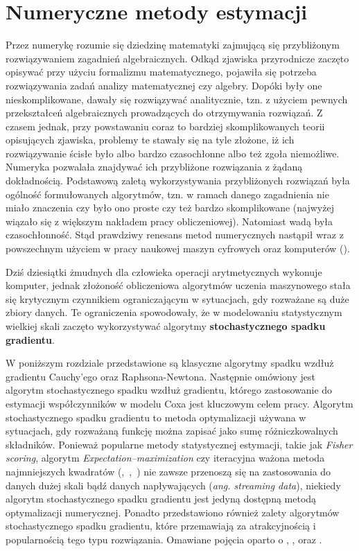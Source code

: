 \chapter{Numeryczne metody estymacji}\label{numPAJ}

Przez numerykę rozumie się dziedzinę matematyki
zajmującą się przybliżonym rozwiązywaniem zagadnień algebraicznych. Odkąd zjawiska przyrodnicze zaczęto opisywać przy użyciu formalizmu matematycznego,
pojawiła się potrzeba rozwiązywania zadań analizy matematycznej czy algebry. Dopóki były
one nieskomplikowane, dawały się rozwiązywać analitycznie, tzn. z użyciem pewnych
przekształceń algebraicznych prowadzących do otrzymywania rozwiązań. Z czasem jednak, przy powstawaniu coraz to bardziej skomplikowanych teorii
opisujących zjawiska, problemy te stawały się na tyle złożone, iż ich rozwiązywanie ścisłe
było albo bardzo czasochłonne albo też zgoła niemożliwe. Numeryka pozwalała znajdywać ich 
przybliżone rozwiązania z żądaną dokładnością. Podstawową zaletą wykorzystywania przybliżonych rozwiązań była ogólność
formułowanych algorytmów, tzn. w ramach danego zagadnienia nie miało znaczenia czy było
ono proste czy też bardzo skomplikowane (najwyżej wiązało się z większym nakładem pracy
obliczeniowej). Natomiast wadą była czasochłonność. Stąd prawdziwy renesans metod
numerycznych nastąpił wraz z powszechnym użyciem w pracy naukowej maszyn cyfrowych oraz komputerów (\cite{milewski}). 

Dziś dziesiątki żmudnych dla człowieka operacji
arytmetycznych wykonuje komputer, jednak złożoność obliczeniowa algorytmów uczenia maszynowego stała się krytycznym czynnikiem ograniczającym w sytuacjach, gdy rozważane są duże zbiory danych. Te ograniczenia spowodowały, że w modelowaniu statystycznym wielkiej skali zaczęto wykorzystywać algorytmy \textbf{stochastycznego spadku gradientu}. 

W poniższym rozdziale przedstawione są klasyczne algorytmy spadku wzdłuż gradientu Cauchy'ego oraz Raphsona-Newtona. Następnie omówiony jest algorytm stochastycznego spadku wzdłuż gradientu, którego zastosowanie do estymacji współczynników w modelu Coxa jest kluczowym celem pracy. Algorytm stochastycznego spadku gradientu to metoda optymalizacji używana w sytuacjach, gdy rozważaną funkcję można zapisać jako sumę różniczkowalnych składników. Ponieważ popularne metody statystycznej estymacji, takie jak \textit{Fisher scoring}, algorytm \textit{Expectation–maximization} czy iteracyjna ważona metoda najmniejszych kwadratów (\cite{fisher3},~\cite{dempster},~\cite{greenPJ}) nie zawsze przenoszą się na zastosowania do danych dużej skali bądź danych napływających (\textit{ang. streaming data}), niekiedy algorytm stochastycznego spadku gradientu jest jedyną dostępną metodą optymalizacji numerycznej. Ponadto przedstawiono również zalety algorytmów stochastycznego spadku gradientu, które przemawiają za atrakcyjnością i popularnością tego typu rozwiązania. Omawiane pojęcia oparto o \cite{bott1}, \cite{bott2}, \cite{kotlowski} oraz \cite{fortuna}.

